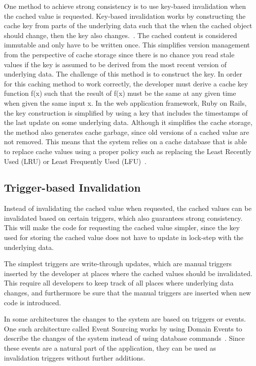 One method to achieve strong consistency is to use key-based invalidation when the cached value is requested. Key-based invalidation works by constructing the cache key from parts of the underlying data such that the when the cached object should change, then the key also changes.~\cite{blog:key-based-invalidation}. The cached content is considered immutable and only have to be written once. This simplifies version management from the perspective of cache storage since there is no chance you read stale values if the key is assumed to be derived from the most recent version of underlying data. The challenge of this method is to construct the key. In order for this caching method to work correctly, the developer must derive a cache key function f(x) such that the result of f(x) must be the same at any given time when given the same input x. In the web application framework, Ruby on Rails, the key construction is simplified by using a key that includes the timestamps of the last update on some underlying data. Although it simplifies the cache storage, the method also generates cache garbage, since old versions of a cached value are not removed. This means that the system relies on a cache database that is able to replace cache values using a proper policy such as replacing the Least Recently Used (LRU) or Least Frequently Used (LFU)~\cite{paper:web-caching-schemes}.



\subsection{Trigger-based Invalidation}
\label{subsec:trigger_based_invalidation}

Instead of invalidating the cached value when requested, the cached values can be invalidated based on certain triggers, which also guarantees strong consistency. This will make the code for requesting the cached value simpler, since the key used for storing the cached value does not have to update in lock-step with the underlying data.

The simplest triggers are write-through updates, which are manual triggers inserted by the developer at places where the cached values should be invalidated. This require all developers to keep track of all places where underlying data changes, and furthermore be sure that the manual triggers are inserted when new code is introduced.

In some architectures the changes to the system are based on triggers or events. One such architecture called Event Sourcing works by using Domain Events to describe the changes of the system instead of using database commands~\cite{blog:focusing-on-events}. Since these events are a natural part of the application, they can be used as invalidation triggers without further additions.

